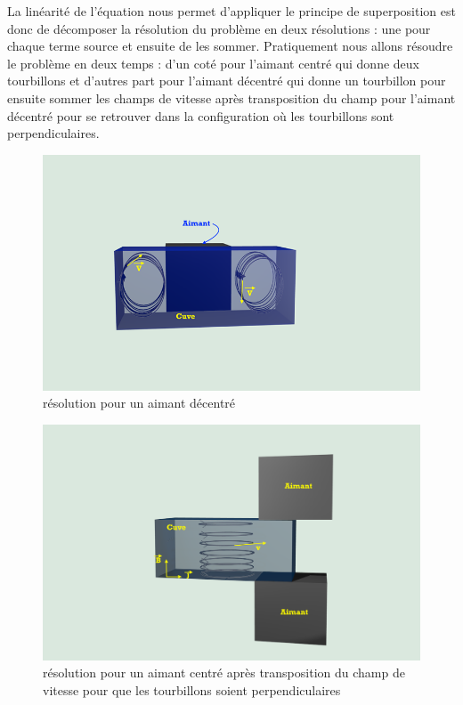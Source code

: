 \documentclass[a4paper,12pt,titlepage]{report}
\begin{document}
\begin{onehalfspace}
La linéarité de l'équation nous permet d'appliquer le principe de superposition est donc de décomposer la résolution du problème en deux résolutions : une pour chaque terme source et ensuite de les sommer.
Pratiquement nous allons résoudre le problème en deux temps : d'un coté pour l'aimant centré qui donne deux tourbillons et d'autres part pour l'aimant décentré qui donne un tourbillon pour ensuite sommer les champs de vitesse après transposition du champ pour l'aimant décentré pour se retrouver dans la configuration où les tourbillons sont perpendiculaires.
\begin{figure}[!h]
	\begin{center}
	\includegraphics[height = 8 cm, keepaspectratio]{graphes/config_centre.png}
	\caption{résolution pour un aimant décentré}
	\label{figure 1k}
	\end{center}
\end{figure}
\begin{figure}[!h]
	\begin{center}
	\includegraphics[height = 8 cm, keepaspectratio]{graphes/champvec2.png}
	\caption{résolution pour un aimant centré après transposition du champ de vitesse pour que les tourbillons soient perpendiculaires}
	\label{figure 1h}
	\end{center}
\end{figure}
\newpage

\end{onehalfspace}
\end{document}
